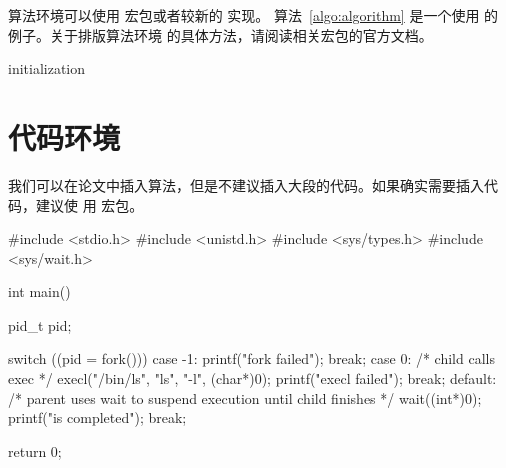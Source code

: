算法环境可以使用  宏包或者较新的  实现。
算法~\ref{algo:algorithm} 是一个使用  的例子。关于排版算法环境
的具体方法，请阅读相关宏包的官方文档。

\begin{algorithm}[htb]
  \caption{算法示例}
  \label{algo:algorithm}
  \SetAlgoLined

  initialization\;
\end{algorithm}

\section{代码环境}

我们可以在论文中插入算法，但是不建议插入大段的代码。如果确实需要插入代码，建议使
用  宏包。

\begin{codeblock}[language=C]
#include <stdio.h>
#include <unistd.h>
#include <sys/types.h>
#include <sys/wait.h>

int main() {
  pid_t pid;

  switch ((pid = fork())) {
  case -1:
    printf("fork failed\n");
    break;
  case 0:
    /* child calls exec */
    execl("/bin/ls", "ls", "-l", (char*)0);
    printf("execl failed\n");
    break;
  default:
    /* parent uses wait to suspend execution until child finishes */
    wait((int*)0);
    printf("is completed\n");
    break;
  }

  return 0;
}
\end{codeblock}
